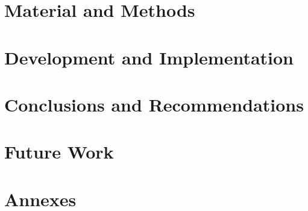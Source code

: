 \documentclass[a4paper, twoside, openright]{report}
\begin{document}
\chapter{Material and Methods}


\chapter{Development and Implementation}











\chapter{Conclusions and Recommendations}


\chapter{Future Work}





\chapter{Annexes}


\backCover{}
\end{document}
